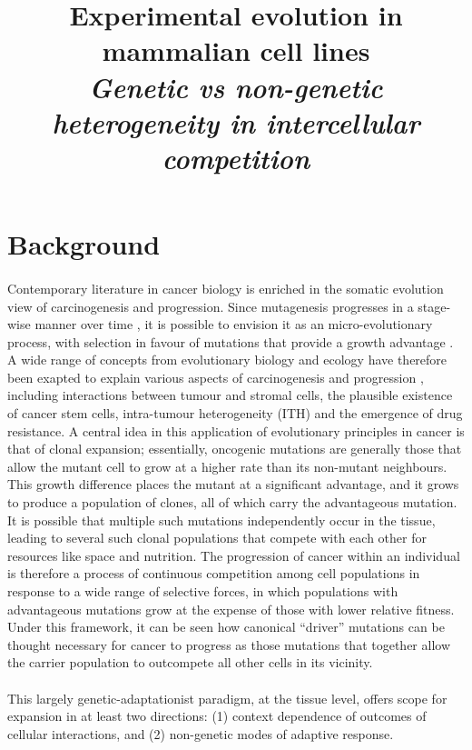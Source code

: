 \documentclass[12pt, letterpaper, onecolumn]{article}
\title{Experimental evolution in mammalian cell lines \\
	\large \textit{Genetic vs non-genetic heterogeneity in intercellular competition}}
\begin{document}
	\maketitle
	\section{Background}
	\paragraph{\empty}Contemporary literature in cancer biology is enriched in the somatic evolution view of carcinogenesis and progression. Since mutagenesis progresses in a stage-wise manner over time \cite{ARMITAGE1954}, it is possible to envision it as an micro-evolutionary process, with selection in favour of mutations that provide a growth advantage \cite{Nowell1976a}. A wide range of concepts from evolutionary biology and ecology have therefore been exapted to explain various aspects of carcinogenesis and progression \cite{Aktipis2013,Gerlinger2014,Kareva2011,Merlo2006,Davis2017a}, including interactions between tumour and stromal cells, the plausible existence of cancer stem cells, intra-tumour heterogeneity (ITH) and the emergence of drug resistance. A central idea in this application of evolutionary principles in cancer is that of clonal expansion; essentially, oncogenic mutations are generally those that allow the mutant cell to grow at a higher rate than its non-mutant neighbours. This growth difference places the mutant at a significant advantage, and it grows to produce a population of clones, all of which carry the advantageous mutation. It is possible that multiple such mutations independently occur in the tissue, leading to several such clonal populations that compete with each other for resources like space and nutrition. The progression of cancer within an individual is therefore a process of continuous competition among cell populations in response to a wide range of selective forces, in which populations with advantageous mutations grow at the expense of those with lower relative fitness. Under this framework, it can be seen how canonical ``driver'' mutations can be thought necessary for cancer to progress as those mutations that together allow the carrier population to outcompete all other cells in its vicinity. 
	
	\paragraph{\empty}This largely genetic-adaptationist paradigm, at the tissue level, offers scope for expansion in at least two directions: (1) context dependence of outcomes of cellular interactions, and (2) non-genetic modes of adaptive response.
	
\end{document}
